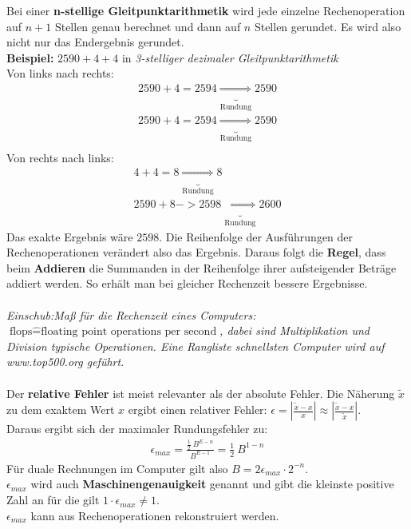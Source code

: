 \documentclass{scrartcl}
\begin{document}
Bei einer \textbf{n-stellige Gleitpunktarithmetik}
wird jede einzelne Rechenoperation auf $n+1$ Stellen genau berechnet und dann auf $n$ Stellen gerundet. Es wird also nicht nur das Endergebnis gerundet.\\
\textbf{Beispiel:} $2590+4+4$ in \textit{3-stelliger dezimaler Gleitpunktarithmetik}\\
Von links nach rechts:
\begin{align*}
2590+4=2594\underbrace{\Rightarrow}_\text{Rundung}2590\\
2590+4=2594\underbrace{\Rightarrow}_\text{Rundung}2590\\
\end{align*}
Von rechts nach links:
\begin{align*}
4+4=8\underbrace{\Rightarrow}_\text{Rundung}8\\
2590+8->2598\underbrace{\Rightarrow}_\text{Rundung}2600
\end{align*}
Das exakte Ergebnis wäre $2598$. 
Die Reihenfolge der Ausführungen der Rechenoperationen verändert also das Ergebnis.
Daraus folgt die \textbf{Regel}, dass beim \textbf{Addieren} die Summanden in der Reihenfolge ihrer aufsteigender Beträge addiert werden.
So erhält man bei gleicher Rechenzeit bessere Ergebnisse.\\
\\
\textit{Einschub:Maß für die Rechenzeit eines Computers:\\
$\text{flops} \hat{=} \text{floating point operations per second}$, dabei sind Multiplikation und Division typische Operationen.
Eine Rangliste schnellsten Computer wird auf www.top500.org geführt.}\\
\\
Der \textbf{relative Fehler} ist meist relevanter als der absolute Fehler.
Die Näherung $\tilde{x}$ zu dem exaktem Wert $x$ ergibt einen relativer Fehler: $\epsilon = |\frac{\tilde{x}-x}{x}| \approx |\frac{\tilde{x}-x}{\tilde{x}}|$.\\
Daraus ergibt sich der maximaler Rundungsfehler zu: 
\begin{align*}
\epsilon_{max}=\frac{\frac{1}{2} \ B^{E-n}}{B^{E-1}}=\frac{1}{2} \ B^{1-n}
\end{align*}
%
Für duale Rechnungen im Computer gilt also $B=2 \epsilon_{max} \cdot 2^{-n}$.\\
$\epsilon_{max}$ wird auch \textbf{Maschinengenauigkeit} genannt und gibt die kleinste positive Zahl an für die gilt $1 \cdot \epsilon_{max} \neq 1$.\\
$\epsilon_{max}$ kann aus Rechenoperationen rekonstruiert werden. 
\end{document}
